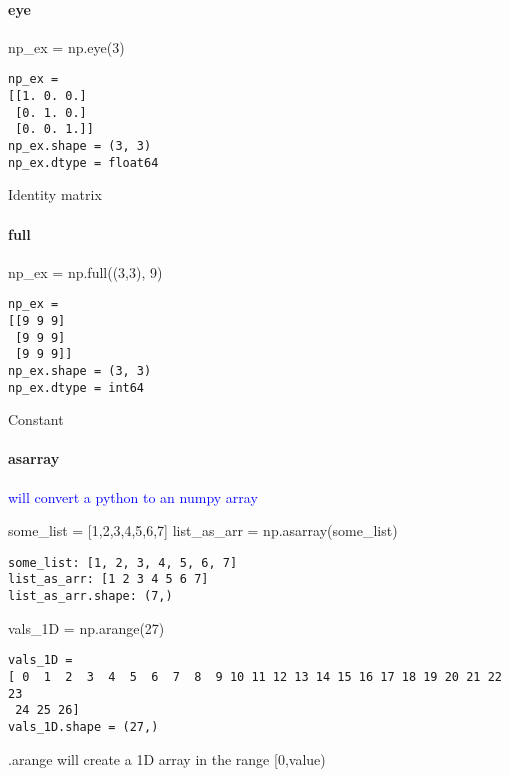 \paragraph{eye}

\begin{python}
np_ex = np.eye(3)
\end{python}
\begin{lstlisting}[style=pyOutStyle]
np_ex = 
[[1. 0. 0.]
 [0. 1. 0.]
 [0. 0. 1.]]
np_ex.shape = (3, 3)
np_ex.dtype = float64
\end{lstlisting}
\begin{markdown}
Identity matrix
\end{markdown}



\paragraph{full}

\begin{python}
np_ex = np.full((3,3), 9)
\end{python}
\begin{lstlisting}[style=pyOutStyle]
np_ex = 
[[9 9 9]
 [9 9 9]
 [9 9 9]]
np_ex.shape = (3, 3)
np_ex.dtype = int64
\end{lstlisting}
\begin{markdown}
Constant
\end{markdown}

\paragraph{asarray}

\textcolor{blue}{ will convert a python  to an numpy array}

\begin{python}
some_list = [1,2,3,4,5,6,7]
list_as_arr = np.asarray(some_list)
\end{python}
\begin{lstlisting}[style=pyOutStyle]
some_list: [1, 2, 3, 4, 5, 6, 7]
list_as_arr: [1 2 3 4 5 6 7]
list_as_arr.shape: (7,)
\end{lstlisting}


\begin{python}
vals_1D = np.arange(27)
\end{python}
\begin{lstlisting}[style=pyOutStyle]
vals_1D = 
[ 0  1  2  3  4  5  6  7  8  9 10 11 12 13 14 15 16 17 18 19 20 21 22 23
 24 25 26]
vals_1D.shape = (27,)
\end{lstlisting}
\begin{markdown}
.arange will create a 1D array in the range [0,value)
\end{markdown}

